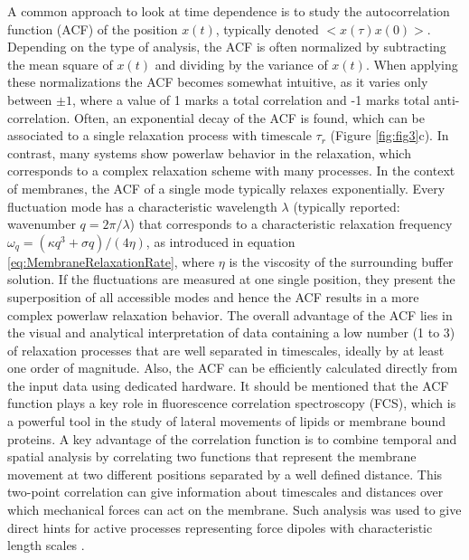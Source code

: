\documentclass[graybox]{svmult}
\begin{document}
A common approach to look at time dependence is to study the autocorrelation function (ACF)  of the position $x(t)$, typically denoted $<x(\tau)x(0)>$. Depending on the type of analysis, the ACF is often normalized by subtracting the mean square of $x(t)$ and dividing by the variance of $x(t)$. When applying these normalizations the ACF becomes somewhat intuitive, as it varies only between $\pm1$, where a value of 1 marks a total correlation and -1 marks total anti-correlation. 
Often, an exponential decay of the ACF is found, which can be associated to a single relaxation process with timescale $\tau_r$ (Figure \ref{fig:fig3}c). In contrast, many systems show powerlaw behavior in the relaxation, which corresponds to a complex relaxation scheme with many processes. In the context of membranes, the ACF of a single mode typically relaxes exponentially. Every fluctuation mode has a characteristic wavelength $\lambda$ (typically reported: wavenumber $q=2\pi/\lambda$) that corresponds to a characteristic relaxation frequency $\omega_q=(\kappa q^3+\sigma q)/(4 \eta)$, as introduced in equation \eqref{eq:MembraneRelaxationRate}, where $\eta$ is the viscosity of the surrounding buffer solution. If the fluctuations are measured at one single position, they present the superposition of all accessible modes and hence the ACF results in a more complex powerlaw relaxation behavior. The overall advantage of the ACF lies in the visual and analytical interpretation of data containing a low number (1 to 3) of relaxation processes that are well separated in timescales, ideally by at least one order of magnitude. Also, the ACF can be efficiently calculated directly from the input data using dedicated hardware. It should be mentioned that the ACF function plays a key role in fluorescence correlation spectroscopy (FCS), which is a powerful tool in the study of lateral movements of lipids or membrane bound proteins. A key advantage of the correlation function is to combine temporal and spatial analysis by correlating two functions that represent the membrane movement at two different positions separated by a well defined distance. This two-point correlation can give information about timescales and distances over which mechanical forces can act on the membrane. Such analysis was used to give direct hints for active processes representing force dipoles with characteristic length scales \cite{Park:2010}. 
\end{document}
